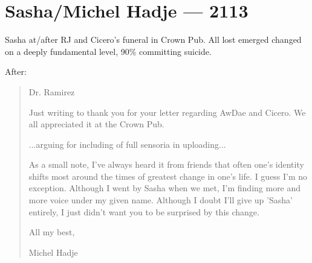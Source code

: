 \chapter*{Sasha/Michel Hadje — 2113}

Sasha at/after RJ and Cicero's funeral in Crown Pub. All lost emerged changed on a deeply fundamental level, 90\% committing suicide.

After:

\begin{quote}
  Dr. Ramirez

  Just writing to thank you for your letter regarding AwDae and Cicero. We all appreciated it at the Crown Pub.

  ...arguing for including of full sensoria in uploading...

  As a small note, I've always heard it from friends that often one's identity shifts most around the times of greatest change in one's life. I guess I'm no exception. Although I went by Sasha when we met, I'm finding more and more voice under my given name. Although I doubt I'll give up 'Sasha' entirely, I just didn't want you to be surprised by this change.

  All my best,

  Michel Hadje
\end{quote}
